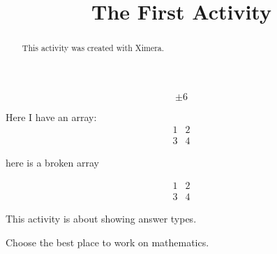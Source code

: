 \documentclass{ximera}
\title{The First Activity}
\begin{document}
  
\begin{abstract}  
This activity was created with Ximera.
\end{abstract}  
\maketitle  


\begin{onlineOnly}
  \begin{center}
  \end{center}
\end{onlineOnly}


\begin{onlineOnly}
  \begin{center}
  \end{center}
\end{onlineOnly}

\begin{onlineOnly}
  \begin{center}
  \end{center}
\end{onlineOnly}

\begin{onlineOnly}
  \begin{center}    
  \end{center}
\end{onlineOnly}


\begin{onlineOnly}
  \begin{center}    
  \end{center}
\end{onlineOnly}

\[
\pm 6
\]

Here I have an array:
\[
\begin{array}{|c|c|}
  1 & 2 \\
  3 & 4
\end{array}
\]

here is a broken array

\[
\begin{array}{|c|c|}
  1 & 2 \\
  
  3 & 4
\end{array}
\]


This activity is about showing answer types.
\begin{problem}  
  Choose the best place to work on mathematics.  
  \begin{multipleChoice}  
  \end{multipleChoice}
\end{problem}
\end{document}
